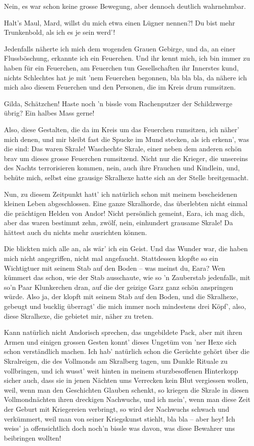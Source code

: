 Nein, es war schon keine grosse Bewegung, aber dennoch deutlich wahrnehmbar.

Halt’s Maul, Mard, willst du mich etwa einen Lügner nennen?! Du bist mehr Trunkenbold, als ich es je sein werd’!

Jedenfalls näherte ich mich dem wogenden Grauen Gebirge, und da, an einer Flussböschung, erkannte ich ein Feuerchen. Und ihr kennt mich, ich bin immer zu haben für ein Feuerchen, am Feuerchen tun Gesellschaften ihr Innerstes kund, nichts Schlechtes hat je mit ’nem Feuerchen begonnen, bla bla bla, da nähere ich mich also diesem Feuerchen und den Personen, die im Kreis drum rumsitzen.

Gilda, Schätzchen! Haste noch ’n bissle vom Rachenputzer der Schildzwerge übrig? Ein halbes Mass gerne!

Also, diese Gestalten, die da im Kreis um das Feuerchen rumsitzen, ich näher’ mich denen, und mir bleibt fast die Spucke im Mund stecken, als ich erkenn’, was die sind: Das waren Skrale! Waschechte Skrale, einer neben dem anderen schön brav um dieses grosse Feuerchen rumsitzend. Nicht nur die Krieger, die unsereins des Nachts terrorisieren kommen, nein, auch ihre Frauchen und Kindlein, und, behüte mich, selbst eine grausige Skralhexe hatte sich an der Stelle breitgemacht.

Nun, zu diesem Zeitpunkt hatt’ ich natürlich schon mit meinem bescheidenen kleinen Leben abgeschlossen. Eine ganze Skralhorde, das überlebten nicht einmal die prächtigen Helden von Andor! Nicht persönlich gemeint, Eara, ich mag dich, aber das waren bestimmt zehn, zwölf, nein, einhundert grausame Skrale! Da hättest auch du nichts mehr ausrichten können.

Die blickten mich alle an, als wär’ ich ein Geist. Und das Wunder war, die haben mich nicht angegriffen, nicht mal angefaucht. Stattdessen klopfte so ein Wichtigtuer mit seinem Stab auf den Boden – was meinst du, Eara? Wen kümmert das schon, wie der Stab ausschaute, wie so 'n Zauberstab jedenfalls, mit so’n Paar Klunkerchen dran, auf die der geizige Garz ganz schön anspringen würde. Also ja, der klopft mit seinem Stab auf den Boden, und die Skralhexe, gebeugt und bucklig überragt’ die mich immer noch mindestens drei Köpf’, also, diese Skralhexe, die gebietet mir, näher zu treten.

Kann natürlich nicht Andorisch sprechen, das ungebildete Pack, aber mit ihren Armen und einigen grossen Gesten konnt’ dieses Ungetüm von ’ner Hexe sich schon verständlich machen. Ich hab’ natürlich schon die Gerüchte gehört über die Skralreigen, die des Vollmonds am Skralberg tagen, um Dunkle Rituale zu vollbringen, und ich wusst’ weit hinten in meinem sturzbesoffenen Hinterkopp sicher auch, dass sie in jenen Nächten ums Verrecken kein Blut vergiessen wollen, weil, wenn man den Geschichten Glauben schenkt, so kriegen die Skrale in diesen Vollmondnächten ihren dreckigen Nachwuchs, und ich mein’, wenn man diese Zeit der Geburt mit Kriegereien verbringt, so wird der Nachwuchs schwach und verkümmert, weil man von seiner Kriegskunst stiehlt, bla bla – aber hey! Ich weiss’ ja offensichtlich doch noch’n bissle was davon, was diese Bewahrer uns beibringen wollten!

